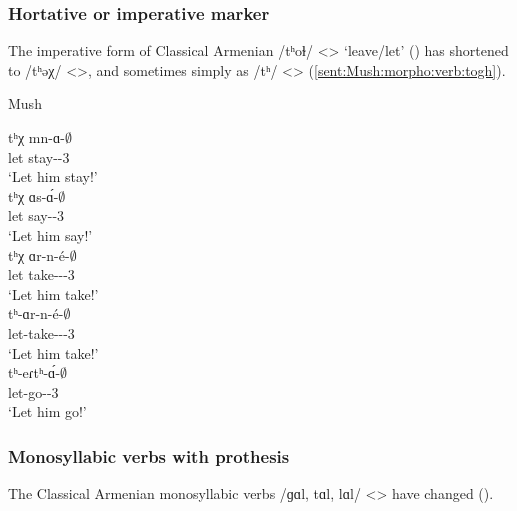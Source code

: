 \begin{adjarianpage}\label{page:120}\end{adjarianpage}%

\subsubsection{Hortative or imperative marker}

The imperative form of Classical Armenian /tʰoɫ/ <> `leave/let' () has shortened to /tʰəχ/ <>, and sometimes simply as /tʰ/ <> (\ref{sent:Mush:morpho:verb:togh}). 

\newpage
\begin{exe}
	\ex Mush \label{sent:Mush:morpho:verb:togh}
	\begin{xlist}
		\ex \gll tʰχ mn-ɑ-$\emptyset$ \\
		let stay-{\thgloss}-3{\sg} \\
		\trans `Let him stay!' \\
		\ex \gll tʰχ ɑs-\'ɑ-$\emptyset$ \\
		let say-{\thgloss}-3{\sg} \\
		\trans `Let him say!' \\
		\ex \gll tʰχ ɑr-n-\'e-$\emptyset$ \\
		let take-{\vx}-{\thgloss}-3{\sg} \\
		\trans `Let him take!' \\
		\ex \gll tʰ-ɑr-n-\'e-$\emptyset$ \\
		let-take-{\vx}-{\thgloss}-3{\sg} \\
		\trans `Let him take!' \\
		\ex \gll tʰ-eɾtʰ-\'ɑ-$\emptyset$ \\
		let-go-{\thgloss}-3{\sg} \\
		\trans `Let him go!' \\
	\end{xlist}
\end{exe}

\subsubsection{Monosyllabic verbs with prothesis}

The Classical Armenian monosyllabic verbs /ɡɑl, tɑl, lɑl/ <> have changed (). 

